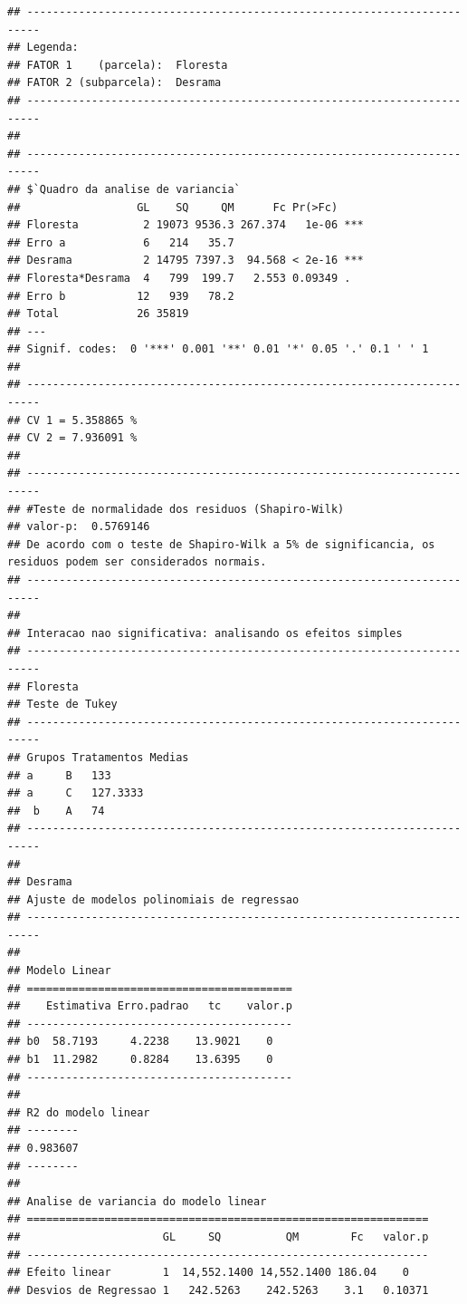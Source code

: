 \documentclass[
]{article}
\begin{document}
\begin{verbatim}
## ------------------------------------------------------------------------
## Legenda:
## FATOR 1    (parcela):  Floresta 
## FATOR 2 (subparcela):  Desrama 
## ------------------------------------------------------------------------
## 
## ------------------------------------------------------------------------
## $`Quadro da analise de variancia`
##                  GL    SQ     QM      Fc Pr(>Fc)    
## Floresta          2 19073 9536.3 267.374   1e-06 ***
## Erro a            6   214   35.7                    
## Desrama           2 14795 7397.3  94.568 < 2e-16 ***
## Floresta*Desrama  4   799  199.7   2.553 0.09349 .  
## Erro b           12   939   78.2                    
## Total            26 35819                           
## ---
## Signif. codes:  0 '***' 0.001 '**' 0.01 '*' 0.05 '.' 0.1 ' ' 1
## 
## ------------------------------------------------------------------------
## CV 1 = 5.358865 %
## CV 2 = 7.936091 %
## 
## ------------------------------------------------------------------------
## #Teste de normalidade dos residuos (Shapiro-Wilk)
## valor-p:  0.5769146 
## De acordo com o teste de Shapiro-Wilk a 5% de significancia, os residuos podem ser considerados normais.
## ------------------------------------------------------------------------
## 
## Interacao nao significativa: analisando os efeitos simples
## ------------------------------------------------------------------------
## Floresta
## Teste de Tukey
## ------------------------------------------------------------------------
## Grupos Tratamentos Medias
## a     B   133 
## a     C   127.3333 
##  b    A   74 
## ------------------------------------------------------------------------
## 
## Desrama
## Ajuste de modelos polinomiais de regressao
## ------------------------------------------------------------------------
## 
## Modelo Linear
## =========================================
##    Estimativa Erro.padrao   tc    valor.p
## -----------------------------------------
## b0  58.7193     4.2238    13.9021    0   
## b1  11.2982     0.8284    13.6395    0   
## -----------------------------------------
## 
## R2 do modelo linear
## --------
## 0.983607
## --------
## 
## Analise de variancia do modelo linear
## ==============================================================
##                      GL     SQ          QM        Fc   valor.p
## --------------------------------------------------------------
## Efeito linear        1  14,552.1400 14,552.1400 186.04    0   
## Desvios de Regressao 1   242.5263    242.5263    3.1   0.10371

\end{verbatim}
\end{document}
